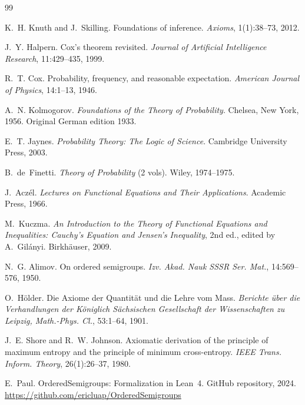 \documentclass[11pt]{article}
\theoremstyle{definition}
\theoremstyle{remark}
\begin{document}
\begin{thebibliography}{99}

K.~H. Knuth and J.~Skilling.
\newblock Foundations of inference.
\newblock \emph{Axioms}, 1(1):38--73, 2012.

J.~Y. Halpern.
\newblock Cox's theorem revisited.
\newblock \emph{Journal of Artificial Intelligence Research}, 11:429--435, 1999.

R.~T. Cox.
\newblock Probability, frequency, and reasonable expectation.
\newblock \emph{American Journal of Physics}, 14:1--13, 1946.

A.~N. Kolmogorov.
\newblock \emph{Foundations of the Theory of Probability}.
\newblock Chelsea, New York, 1956. Original German edition 1933.

E.~T. Jaynes.
\newblock \emph{Probability Theory: The Logic of Science}.
\newblock Cambridge University Press, 2003.

B.~de~Finetti.
\newblock \emph{Theory of Probability} (2 vols).
\newblock Wiley, 1974--1975.

J.~Acz\'el.
\newblock \emph{Lectures on Functional Equations and Their Applications}.
\newblock Academic Press, 1966.

M.~Kuczma.
\newblock \emph{An Introduction to the Theory of Functional Equations and Inequalities:
Cauchy's Equation and Jensen's Inequality}, 2nd ed., edited by A.~Gil\'anyi.
\newblock Birkh\"auser, 2009.

N.~G. Alimov.
\newblock On ordered semigroups.
\newblock \emph{Izv. Akad. Nauk SSSR Ser. Mat.}, 14:569--576, 1950.

O.~H\"older.
\newblock Die Axiome der Quantit\"at und die Lehre vom Mass.
\newblock \emph{Berichte \"uber die Verhandlungen der K\"oniglich S\"achsischen
Gesellschaft der Wissenschaften zu Leipzig, Math.-Phys. Cl.}, 53:1--64, 1901.

J.~E. Shore and R.~W. Johnson.
\newblock Axiomatic derivation of the principle of maximum entropy and the principle of
minimum cross-entropy.
\newblock \emph{IEEE Trans. Inform. Theory}, 26(1):26--37, 1980.

E.~Paul.
\newblock OrderedSemigroups: Formalization in Lean~4.
\newblock GitHub repository, 2024. \url{https://github.com/ericluap/OrderedSemigroups}

\end{thebibliography}
\end{document}
